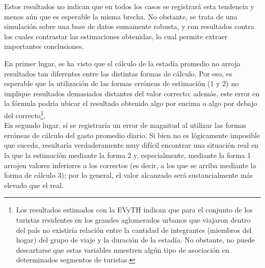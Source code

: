 \documentclass[
]{book}
\begin{document}
Estos resultados no indican que en todos los casos se registrará esta tendencia y menos aún que es esperable la misma brecha. No obstante, se trata de una simulación sobre una base de datos sumamente robusta, y con resultados contra los cuales contrastar las estimaciones obtenidas, lo cual permite extraer importantes conclusiones.

En primer lugar, se ha visto que el cálculo de la estadía promedio no arroja resultados tan diferentes entre las distintas formas de cálculo. Por eso, es esperable que la utilización de las formas erróneas de estimación (1 y 2) no implique resultados demasiados distantes del valor correcto; además, este error en la fórmula podría ubicar el resultado obtenido algo por encima o algo por debajo del correcto\footnote{Los resultados estimados con la EVyTH indican que para el conjunto de los turistas residentes en los grandes aglomerados urbanos que viajaron dentro del país no existiría relación entre la cantidad de integrantes (miembros del hogar) del grupo de viaje y la duración de la estadía. No obstante, no puede descartarse que estas variables muestren algún tipo de asociación en determinados segmentos de turistas.}.\\

En segundo lugar, sí se registraría un error de magnitud al utilizar las formas erróneas de cálculo del gasto promedio diario. Si bien no es lógicamente imposible que suceda, resultaría verdaderamente muy difícil encontrar una situación real en la que la estimación mediante la forma 2 y, especialmente, mediante la forma 1 arrojen valores inferiores a los correctos (es decir, a los que se arriba mediante la forma de cálculo 3); por lo general, el valor alcanzado será sustancialmente más elevado que el real.
\end{document}
